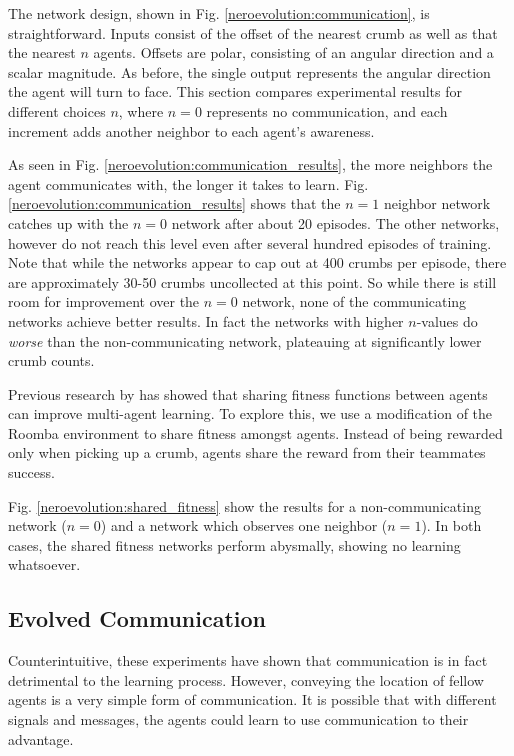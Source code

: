 \documentclass[conference]{IEEEtran}
\begin{document}
The network design, shown in Fig. \ref{neroevolution:communication}, is straightforward. Inputs consist of the offset of the nearest crumb as well as that the nearest $n$ agents. Offsets are polar, consisting of an angular direction and a scalar magnitude. As before, the single output represents the angular direction the agent will turn to face. 
This section compares experimental results for different choices $n$, where $n=0$ represents no communication, and each increment adds another neighbor to each agent's awareness.


As seen in Fig. \ref{neroevolution:communication_results}, the more neighbors the agent communicates with, the longer it takes to learn.  Fig. \ref{neroevolution:communication_results} shows that the $n=1$ neighbor network catches up with the $n=0$ network after about 20 episodes. The other networks, however do not reach this level even after several hundred episodes of training. Note that while the networks appear to cap out at 400 crumbs per episode, there are approximately 30-50 crumbs uncollected at this point. So while there is still room for improvement over the $n=0$ network, none of the communicating networks achieve better results. In fact the networks with higher $n$-values do \textit{worse} than the non-communicating network, plateauing at significantly lower crumb counts.

Previous research by \cite{rajagopalan2011role} has showed that sharing fitness functions between agents can improve multi-agent learning. 
To explore this, we use a modification of the Roomba environment to share fitness amongst agents. Instead of being rewarded only when picking up a crumb, agents share the reward from their teammates success. 

Fig. \ref{neroevolution:shared_fitness} show the results for a non-communicating network ($n=0$) and a network which observes one neighbor ($n=1$). In both cases, the shared fitness networks perform abysmally, showing no learning whatsoever.


\subsection{Evolved Communication}

Counterintuitive, these experiments have shown that communication is in fact detrimental to the learning process.
However, conveying the location of fellow agents is a very simple form of communication. It is possible that with different signals and messages, the agents could learn to use communication to their advantage.
\end{document}
